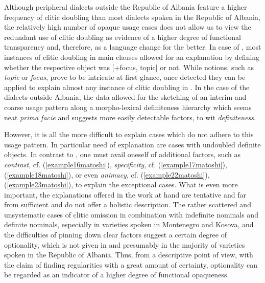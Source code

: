 \documentclass[output=paper]{langsci/langscibook}
\begin{document}
Although peripheral  dialects outside the Republic of Albania feature a higher frequency of clitic doubling than most  dialects spoken in the Republic of Albania, the relatively high number of opaque usage cases does not allow us to view the redundant use of clitic doubling as evidence of a higher degree of functional transparency and, therefore, as a language change for the better. In case of , most instances of clitic doubling in main clauses allowed for an explanation by defining whether the respective object was [+focus, \textminus{}topic] or not. While notions, such as \textit{topic} or \textit{focus}, prove to be intricate at first glance, once detected they can be applied to explain almost any instance of clitic doubling in .
In the case of the dialects outside Albania, the data allowed for the sketching of an interim and coarse usage pattern along a morpho-lexical definiteness hierarchy which seems neat \textit{prima facie} and suggests more easily detectable factors, to wit \textit{definiteness}. 

However, it is all the more difficult to explain cases which do not adhere to this usage pattern. In particular need of explanation are cases with undoubled definite objects. In contrast to , one must avail oneself of additional factors, such as \textit{contrast}, cf. (\ref{example16matoshi}), \textit{specificity}, cf. (\ref{example17matoshi}), (\ref{example18matoshi}), or even \textit{animacy}, cf. (\ref{example22matoshi}), (\ref{example23matoshi}), to explain the exceptional cases. What is even more important, the explanations offered in the work at hand are tentative and far from sufficient and do not offer a holistic description. The rather scattered and unsystematic cases of clitic omission in combination with indefinite nominals and definite nominals, especially in  varieties spoken in Montenegro and Kosova, and the difficulties of pinning down clear factors suggest a certain degree of optionality, which is not given in  and presumably in the majority of varieties spoken in the Republic of Albania. Thus, from a descriptive point of view, with the claim of finding regularities with a great amount of certainty, optionality can be regarded as an indicator of a higher degree of functional opaqueness. 
\end{document}
